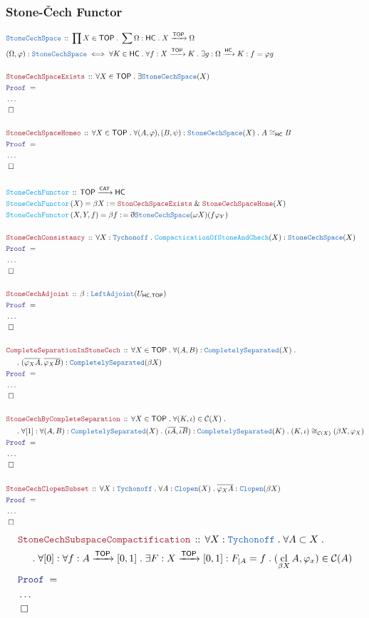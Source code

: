 \documentclass[12pt]{scrartcl}
\newcommand{\TYPE}[1]{\textcolor{NavyBlue}{\mathtt{#1}}}
\newcommand{\FUNC}[1]{\textcolor{Cerulean}{\mathtt{#1}}}
\newcommand{\LOGIC}[1]{\textcolor{Blue}{\mathtt{#1}}}
\newcommand{\THM}[1]{\textcolor{Maroon}{\mathtt{#1}}}
\renewcommand{\.}{\; . \;}
\newcommand{\de}{: \kern 0.1pc =}
\newcommand{\Act}[1]{\left( #1 \right)}
\newcommand{\Theorem}[2]{& \THM{#1} \, :: \, #2 \\ & \Proof = \\ }
\newcommand{\DeclareType}[2]{& \TYPE{#1} \, :: \, #2 \\}
\newcommand{\DefineType}[3]{& #1 : \TYPE{#2} \iff #3 \\}
\newcommand{\DeclareFunc}[2]{& \FUNC{#1} \, :: \, #2 \\}
\newcommand{\DefineNamedFunc}[4]{&  \FUNC{#1}\Act{#2} = #3 \de #4 \\}
\newcommand{\NewLine}{\\ & \kern 1pc}
\newcommand{\Page}[1]{ \begin{align*} #1 \end{align*}   }
\newcommand{ \bd }{ \ByDef }
\newcommand{\NoProof}{ & \ldots \\ \EndProof}
\renewcommand{\And}{\; \& \;}
\newcommand{\Arrow}{\xrightarrow}
\newcommand{\QED}{\; \square}
\newcommand{\EndProof}{& \QED \\}
\newcommand{\ByDef}{\eth}
\newcommand{\Proof}{\LOGIC{Proof} \; }
\renewcommand{\C}{\mathcal{C}}
\newcommand{\CAT}{\mathsf{CAT}}
\DeclareMathOperator*{\cl}{cl}
\newcommand{\TOP}{\mathsf{TOP}}
\newcommand{\HC}{\mathsf{HC}}
\begin{document}
\subsubsection{Stone-\v{C}ech Functor}
\Page{
	\DeclareType{StoneCechSpace}{\prod X \in \TOP \. \sum \Omega : \HC \.  X \Arrow{\TOP} \Omega }
	\DefineType{(\Omega,\varphi)}{StoneCechSpace}
	{
		 \forall K \in \HC \. \forall f : X \Arrow{\TOP} K \. 
		 \exists g : \Omega \Arrow{\HC} K :  f = \varphi g  
	}
	\\
	\Theorem{StoneCechSpaceExists}
	{
		\forall X \in \TOP \. \exists \TYPE{StoneCechSpace}(X)
	}
	\NoProof
	\\
	\Theorem{StoneCechSpaceHomeo}
	{
		\forall X \in \TOP \. \forall (A,\varphi),(B,\psi) : \TYPE{StoneCechSpace}(X)
		\. A \cong_{\HC} B 
	}
	\NoProof
	\\
	\DeclareFunc{StoneCechFunctor}{\TOP \Arrow{\CAT} \HC}
	\DefineNamedFunc{StoneCechFunctor}{X}{\beta X}{\THM{StonCechSpaceExists}
		\And \THM{StoneCechSpaceHome}(X)}
	\DefineNamedFunc{StoneCechFunctor}{X,Y,f}{\beta f}{\bd \TYPE{StoneCechSpace}(\omega X)(f\varphi_Y)}
	\\
	\Theorem{StoneCechConsistancy}
	{
		\forall X : \TYPE{Tychonoff} \. \FUNC{CompacticationOfStoneAndChech}(X) : \TYPE{StoneCechSpace}(X)
	}
	\NoProof
	\\
	\Theorem{StoneCechAdjoint}{\beta : \TYPE{LeftAdjoint}(U_{\HC,\TOP})}
	\NoProof
	\\
	\Theorem{CompleteSeparationInStoneCech}
	{
		\forall X \in \TOP \. 
		\forall (A,B)  :  \TYPE{CompletelySeparated}(X) \. \NewLine \.
		(\overline{\varphi_X A}, \overline{\varphi_X B})  : \TYPE{CompletelySeparated}(\beta X)
	}
	\NoProof
	\\
	\Theorem{StoneCechByCompleteSeparation}
	{
		\forall X \in \TOP \.
		\forall (K,\iota) \in \C(X) \.  \NewLine \.
		\forall [1] : \forall (A,B) : \TYPE{CompletelySeparated}(X) \.   
			(\overline{\iota A}, \overline{\iota B} ) : \TYPE{CompletelySeparated}(K)	 \.
		(K,\iota) \cong_{\C(X)} (\beta X,\varphi_X)	
	}
	\NoProof
	\\
	\Theorem{StoneCechClopenSubset}
	{
		\forall X : \TYPE{Tychonoff} \.
		\forall A  : \TYPE{Clopen}(X) \.
		\overline{\varphi_X A} : \TYPE{Clopen}(\beta X)		
	} 
	\NoProof
}\Page{
	\Theorem{ StoneCechSubspaceCompactification}
	{
	 	\forall X : \TYPE{Tychonoff} \.
	 	\forall A \subset X \. \NewLine \.
	 	\forall  [0] : \forall f : A \Arrow{\TOP} [0,1] \. \exists F : X \Arrow{\TOP} [0,1] : F_{|A} = f  \.
	 	 (\cl_{\beta X} A,\varphi_x) \in \C(A) 
	}
	\NoProof
	\\
}
\end{document}

